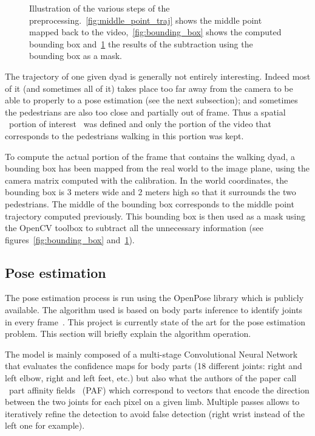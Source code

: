 \documentclass[12pt,a4paper,twoside]{article}
\begin{document}
\begin{figure}
\begin{subfigure}[b]{0.45\textwidth}
        \caption{}
        \label{fig:masked}
    \end{subfigure}
    \caption{Illustration of the various steps of the preprocessing.~\ref{fig:middle_point_traj} shows the middle point mapped back to the video,~\ref{fig:bounding_box} shows the computed bounding box and~\ref{fig:masked} the results of the subtraction using the bounding box as a mask.}\label{fig:preprocessing}
\end{figure}

The trajectory of one given dyad is generally not entirely interesting. Indeed most of it (and sometimes all of it) takes place too far away from the camera to be able to properly to a pose estimation (see the next subsection); and sometimes the pedestrians are also too close and partially out of frame. Thus a spatial \guillemotleft~portion of interest \guillemotright~was defined and only the portion of the video that corresponds to the pedestrians walking in this portion was kept.

To compute the actual portion of the frame that contains the walking dyad, a bounding box has been mapped from the real world to the image plane, using the camera matrix computed with the calibration. In the world coordinates, the bounding box is 3 meters wide and 2 meters high so that it surrounds the two pedestrians. The middle of the bounding box corresponds to the middle point trajectory computed previously. This bounding box is then used as a mask using the OpenCV toolbox to subtract all the unnecessary information (see figures~\ref{fig:bounding_box} and~\ref{fig:masked}).

\subsection{Pose estimation}
The pose estimation process is run using the OpenPose library which is publicly available. The algorithm used is based on body parts inference to identify joints in every frame~\cite{Cao2016}. This project is currently state of the art for the pose estimation problem. This section will briefly explain the algorithm operation.

The model is mainly composed of a multi-stage Convolutional Neural Network that evaluates the confidence maps for body parts (18 different joints: right and left elbow, right and left feet, etc.) but also what the authors of the paper call \guillemotleft~part affinity fields \guillemotright~(PAF) which correspond to vectors that encode the direction between the two joints for each pixel on a given limb. Multiple passes allows to iteratively refine the detection to avoid false detection (right wrist instead of the left one for example). 
\end{document}
